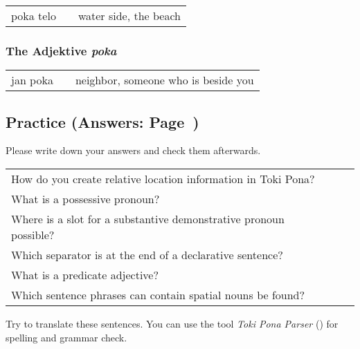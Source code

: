 \begin{supertabular}{p{5,5cm}|ll}
    poka telo &  & water side, the beach \\
\end{supertabular}

%
\subsubsection*{The Adjektive \textit{poka}}
%

\begin{supertabular}{p{5,5cm}|ll}
    jan poka &  & neighbor, someone who is beside you \\
\end{supertabular}

%
%
%
\newpage
%
\subsection*{Practice (Answers: Page~\pageref{'other_prepositions'})}
%
Please write down your answers and check them afterwards.

\begin{supertabular}{p{5,5cm}|ll}
    How do you create relative location information in Toki Pona?     &  & \\ %
    What is a possessive pronoun?                                     &  & \\ %
    Where is a slot for a substantive demonstrative pronoun possible? &  & \\ %
    Which separator is at the end of a declarative sentence?          &  & \\ %
    What is a predicate adjective?                                    &  & \\ %
    Which sentence phrases can contain spatial nouns be found?        &  & \\ %
\end{supertabular}

Try to translate these sentences.
You can use the tool \textit{Toki Pona Parser} (\cite{www:rowa:02}) for spelling and grammar check.


